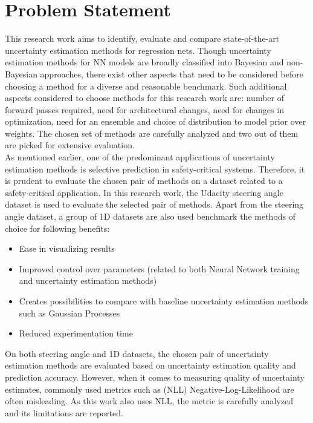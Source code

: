     \section{Problem Statement}
    This research work aims to identify, evaluate and compare state-of-the-art uncertainty estimation methods for regression nets. Though uncertainty estimation methods for NN models are broadly classified into Bayesian and non-Bayesian approaches, there exist other aspects that need to be considered before choosing a method for a diverse and reasonable benchmark. Such additional aspects considered to choose methods for this research work are: number of forward passes required, need for architectural changes, need for changes in optimization, need for an ensemble and choice of distribution to model prior over weights. The chosen set of methods are carefully analyzed and two out of them are picked for extensive evaluation.\\
    As mentioned earlier, one of the predominant applications of uncertainty estimation methods is selective prediction in safety-critical systems. Therefore, it is prudent to evaluate the chosen pair of methods on a dataset related to a safety-critical application. In this research work, the Udacity steering angle dataset is used to evaluate the selected pair of methods. Apart from the steering angle dataset, a group of 1D datasets are also used benchmark the methods of choice for following benefits:
    \begin{itemize}
    	
    	\item Ease in visualizing results
    	\item Improved control over parameters (related to both Neural Network training and uncertainty estimation methods)
    	\item Creates possibilities to compare with baseline uncertainty estimation methods such as Gaussian Processes
    	\item Reduced experimentation time
    \end{itemize}
	On both steering angle and 1D datasets, the chosen pair of uncertainty estimation methods are evaluated based on uncertainty estimation quality and prediction accuracy. However, when it comes to measuring quality of uncertainty estimates, commonly used metrics such as (NLL) Negative-Log-Likelihood are often misleading\cite{yao2019quality}. As this work also uses NLL, the metric is carefully analyzed and its limitations are reported.
	
